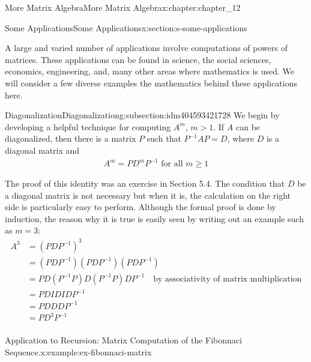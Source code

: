 \documentclass[twoside,10pt,]{book}
\numberwithin{equation}{section}
\begin{document}
\begin{chapterptx}{More Matrix Algebra}{}{More Matrix Algebra}{}{}{x:chapter:chapter_12}
\typeout{************************************************}
%
\begin{sectionptx}{Some Applications}{}{Some Applications}{}{}{x:section:s-some-applications}
\begin{introduction}{}%
A large and varied number of applications involve computations of powers of matrices. These applications can be found in science, the social sciences, economics, engineering, and, many other areas where mathematics is used.  We will consider a few diverse examples the mathematics behind these applications here.%
\end{introduction}%
%
%
\typeout{************************************************}
\typeout{************************************************}
%
\begin{subsectionptx}{Diagonalization}{}{Diagonalization}{}{}{g:subsection:idm404593421728}
We begin by developing a helpful technique for computing \(A^m\),  \(m > 1\).  If \(A\) can be diagonalized, then there is a matrix \(P\) such that \(P^{-1}A P = D\),  where \(D\) is a diagonal matrix and%
\begin{gather}
A^m= P D^m P^{-1} \textrm{ for all } m\geq 1\label{x:mrow:eq-matrix-power}
\end{gather}
%
\par
The proof of this identity was an exercise in Section 5.4.  The condition that \(D\) be a diagonal matrix is not necessary but when it is, the calculation on the right side is particularly easy to perform.  Although the formal proof  is done by induction, the reason why it is true is easily seen by writing out an example such as \(m=3\):%
\begin{equation*}
\begin{split}
A^3   & = \left(P D P^{-1}\right)^3\\
& =\left(P D P^{-1}\right)\left(P D P^{-1}\right)\left(P D P^{-1}\right)\\
&= P D \left(P^{-1}P\right) D \left(P^{-1}P \right)D P^{-1}\quad\textrm{by associativity of matrix multiplication}\\
&= P D I D I D P^{-1}\\
&= P D D D P^{-1}\\	
&= P D^3 P^{-1}\\
\end{split}
\end{equation*}
%
\begin{example}{Application to Recursion: Matrix Computation of the Fibonnaci Sequence.}{x:example:ex-fibonnaci-matrix}%

\end{example}
\end{subsectionptx}
\end{sectionptx}
\end{chapterptx}
\end{document}
